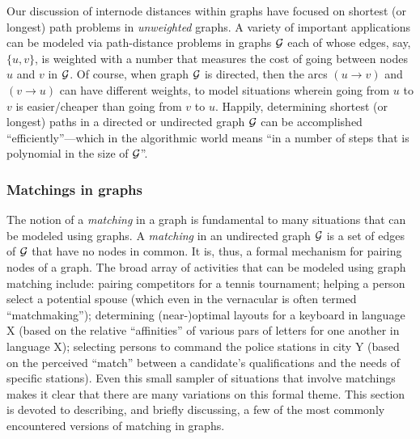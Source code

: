 
\bigskip

Our discussion of internode distances within graphs have focused on
shortest (or longest) path problems in {\em unweighted} graphs.  A
variety of important applications can be modeled via path-distance
problems in graphs $\mbox{$\cal G$}$ each of whose edges, say, $\{u,v\}$, is
weighted with a number that measures the cost of going between nodes
$u$ and $v$ in $\mbox{$\cal G$}$.  Of course, when graph $\mbox{$\cal G$}$ is directed, then the
arcs $(u \rightarrow v)$ and $(v \rightarrow u)$ can have different
weights, to model situations wherein going from $u$ to $v$ is
easier/cheaper than going from $v$ to $u$.  Happily, determining
shortest (or longest) paths in a directed or undirected graph $\mbox{$\cal G$}$ can
be accomplished ``efficiently''---which in the algorithmic world means
``in a number of steps that is polynomial in the size of $\mbox{$\cal G$}$''.
 

\subsubsection{Matchings in graphs}

The notion of a {\it matching} in a graph is fundamental to many
situations that can be modeled using graphs.  A {\it matching} in an
undirected graph $\mbox{$\cal G$}$ is a set of edges of $\mbox{$\cal G$}$ that have no nodes in
common.  It is, thus, a formal mechanism for pairing nodes of a graph.
The broad array of activities that can be modeled using graph matching
include: pairing competitors for a tennis tournament; helping a person
select a potential spouse (which even in the vernacular is often
termed ``matchmaking''); determining (near-)optimal layouts for a
keyboard in language X (based on the relative ``affinities'' of
various pars of letters for one another in language X); selecting
persons to command the police stations in city Y (based on the
perceived ``match'' between a candidate's qualifications and the needs
of specific stations).  Even this small sampler of situations that
involve matchings makes it clear that there are many variations on
this formal theme.  This section is devoted to describing, and briefly
discussing, a few of the most commonly encountered versions of
matching in graphs.
\bigskip

